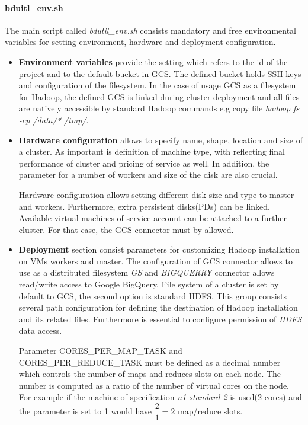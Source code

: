 \documentclass[a4paper,12pt,oneside]{report}
\begin{document}
	
	
	\paragraph{bduitl\_env.sh}\label{bdutilenv}The main script called
	\textit{bdutil\_env.sh} consists mandatory 	and free environmental variables for setting environment, hardware and deployment configuration.
	
	\begin{itemize}
		\item \textbf{Environment variables} provide the setting which refers to the id
		of the project and to 	the default bucket in GCS. The defined bucket holds SSH keys and configuration of the filesystem. In the case of usage GCS as a filesystem for Hadoop, the defined GCS is linked during cluster deployment and all files are natively accessible by standard Hadoop commands e.g copy file \textit{hadoop fs -cp  /data/* /tmp/}.
		
		\item \textbf{Hardware configuration}
		allows to specify name, shape, location and size of a cluster. As important is
		definition of machine type, with reflecting final performance of cluster and 
		pricing of service as well. In addition, the parameter 
		for a number of workers and size of the disk are also crucial.
		
		Hardware configuration allows setting different disk size and  type to
		master and workers. Furthermore, extra persistent disks(PDs) can be linked.
		Available virtual machines of service	account can be attached to a further 
		cluster. For that case, the GCS connector must by allowed.
		
		\item \textbf{Deployment} section consist parameters for customizing Hadoop
		installation on VMs workers and master. The configuration of GCS connector 
		allows to use as a distributed filesystem \textit{GS} and \textit{BIGQUERRY}
		connector allows read/write access to Google BigQuery. File
		system of a cluster is set by default to GCS, the second 
		option is standard HDFS. This group consists several path configuration for
		defining the destination of Hadoop installation and its related files. 
		Furthermore is essential to configure permission  of \textit{HDFS} data access.
		
		Parameter CORES\_PER\_MAP\_TASK and CORES\_PER\_REDUCE\_TASK must be defined as
		a decimal number which controls the number of maps and reduces slots on each node. 
		The number is computed as a ratio of the number of virtual cores on the node. 
		For example if the machine of specification \textit{ n1-standard-2} 
		is used(2 cores) and the parameter is set to 1 would have $\dfrac{2}{1} = 2$
		map/reduce slots.
	\end{itemize}
	
\end{document}
